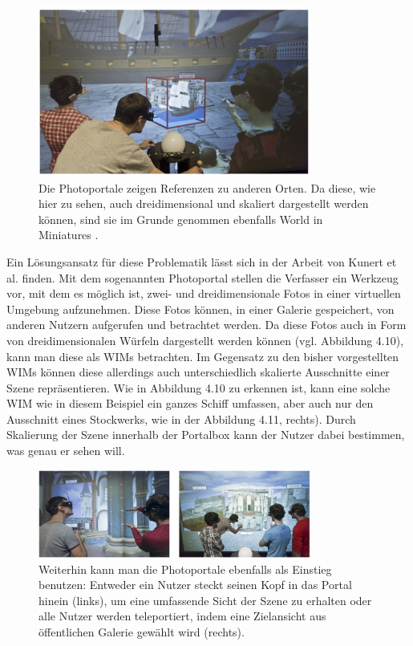 \begin{figure}[h]
  \centering
  \includegraphics[width=0.8\textwidth]{images/ship_pointer.png}
  \caption{Die Photoportale zeigen Referenzen zu anderen Orten. Da diese, wie hier zu sehen, auch dreidimensional und skaliert dargestellt werden können, sind sie im Grunde genommen ebenfalls World in Miniatures \cite{Kunert2014Photoportals}.}
  \label{fig:todo}
\end{figure}

Ein Lösungsansatz für diese Problematik lässt sich in der Arbeit von Kunert et al. \cite{Kunert2014Photoportals} finden.
Mit dem sogenannten Photoportal stellen die Verfasser ein Werkzeug vor, mit dem es möglich ist, zwei- und dreidimensionale \glqq Fotos\grqq{} in einer virtuellen Umgebung aufzunehmen.
Diese Fotos können, in einer Galerie gespeichert, von anderen Nutzern aufgerufen und betrachtet werden. Da diese Fotos auch in Form von dreidimensionalen Würfeln dargestellt werden können (vgl. Abbildung 4.10), kann man diese als WIMs betrachten.
Im Gegensatz zu den bisher vorgestellten WIMs können diese allerdings auch unterschiedlich skalierte Ausschnitte einer Szene repräsentieren. Wie in Abbildung 4.10 zu erkennen ist, kann eine solche WIM wie in diesem Beispiel ein ganzes Schiff umfassen, aber auch nur den Ausschnitt eines Stockwerks, wie in der Abbildung 4.11, rechts). Durch Skalierung der Szene innerhalb der Portalbox kann der Nutzer dabei bestimmen, was genau er sehen will.

\begin{figure}[h]
  \centering
  \includegraphics[width=0.8\textwidth]{images/photoportals.png}
  \caption{Weiterhin kann man die Photoportale ebenfalls als Einstieg benutzen: Entweder ein Nutzer steckt seinen Kopf in das Portal hinein (links), um eine umfassende Sicht der Szene zu erhalten oder alle Nutzer werden teleportiert, indem eine Zielansicht aus öffentlichen Galerie gewählt wird (rechts).}
  \label{fig:todo}
\end{figure}

